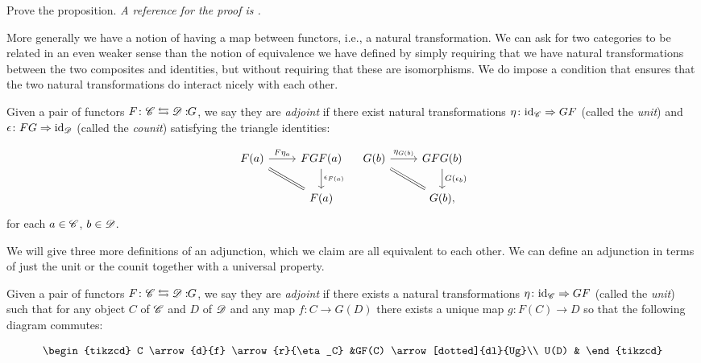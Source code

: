 \documentclass{article}[11pt]
\begin{document}
\begin{exercise}
Prove the proposition. \emph{A reference for the proof is \cite[Proposition 1]{WOMP}.}
\end{exercise}

More generally we have a notion of having a map between functors, i.e., a natural transformation. We can ask for two categories to be related in an even weaker sense than the notion of equivalence we have defined by simply requiring that we have natural transformations between the two composites and identities, but without requiring that these are isomorphisms. We do impose a condition that ensures that the two natural transformations do interact nicely with each other.

\begin{definition}\label{def1} Given a pair of functors $F\colon \mathscr{C} \leftrightarrows \mathscr{D}:\!\! G$, we say they are \textit{adjoint} if there exist natural transformations $\eta \colon \text{id}_{\mathscr{C}} \Rightarrow GF$ (called the \textit{unit}) and $\epsilon \colon FG \Rightarrow \text{id}_{\mathscr{D}}$ (called the \textit{counit}) satisfying the triangle identities:

\[
	\begin{tikzcd}
	F(a)\rar["F\eta_a" above]\ar[equal, dr] & FGF(a)\dar["\epsilon_{F(a)}" right] \\
	 & F(a)
	\end{tikzcd}\quad
	\begin{tikzcd}
	G(b)\rar["\eta_{G(b)}" above]\ar[equal, dr] & GFG(b)\dar["G(\epsilon_b)" right]\\
	& G(b),
	\end{tikzcd}
\]
for each $a\in \mathscr{C}$, $b\in \mathscr{D}$.

\end{definition}

We will give three more definitions of an adjunction, which we claim are all equivalent to each other. We can define an adjunction in terms of just the unit or the counit together with a universal property.

\begin{definition}\label{def2}
Given a pair of functors $F\colon \mathscr{C} \leftrightarrows \mathscr{D}:\!\! G$, we say they are \textit{adjoint} if there exists a natural transformations $\eta \colon \text{id}_{\mathscr{C}} \Rightarrow GF$ (called the \textit{unit}) such that for any object $C$ of $\mathscr{C}$ and $D$ of $\mathscr{D}$ and any map $f\colon C\to G(D)$ there exists a unique map $g \colon F(C) \to D$ so that the following diagram commutes:

\[\begin{tikzcd}
C \arrow{d}{f} \arrow{r}{\eta_C} &GF(C) \arrow[dotted]{dl}{Ug}\\
U(D)  & 
\end{tikzcd}\]
\end{definition} 
\end{document}
